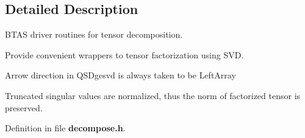 \subsection{Detailed Description}
B\-T\-A\-S driver routines for tensor decomposition. 
\begin{DoxyItemize}
\item Provide convenient wrappers to tensor factorization using S\-V\-D.
\item Arrow direction in Q\-S\-Dgesvd is always taken to be Left\-Array
\item Truncated singular values are normalized, thus the norm of factorized tensor is preserved. 
\end{DoxyItemize}

Definition in file {\bf decompose.\-h}.

